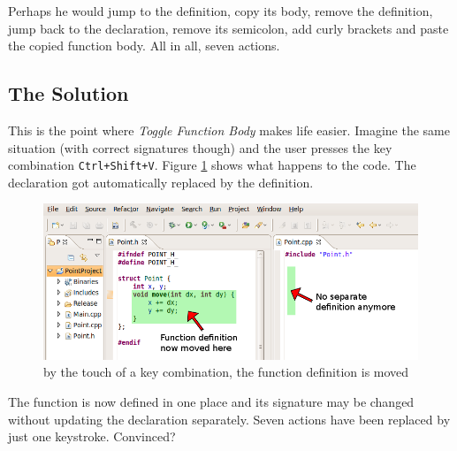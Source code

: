 Perhaps he would jump to the definition, copy its body, remove the definition, 
jump back to the declaration, remove its semicolon, add curly brackets and paste 
the copied function body. All in all, seven actions.

\subsection{The Solution}
This is the point where \textit{Toggle Function Body} makes life easier. Imagine 
the same situation (with correct signatures though) and the user presses the key 
combination \texttt{Ctrl+Shift+V}. Figure \ref{coolResult} shows what happens
to 
the code. The declaration got automatically replaced by the definition.

\begin{figure}[h]
\centering
\includegraphics[width=\textwidth]{images/resulting_function.png}
\caption{by the touch of a key combination, the function definition is moved}
\label{coolResult}
\end{figure}

The function is now defined in one place and its signature may be changed 
without updating the declaration separately. Seven actions have been replaced by 
just one keystroke. Convinced?

